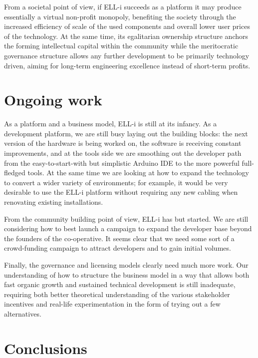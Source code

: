 \documentclass[final]{siamltex}
\begin{document}
From a societal point of view, if ELL-i succeeds as a platform it may
produce essentially a virtual non-profit monopoly, benefiting the
society through the increased efficiency of scale of the used
components and overall lower user prices of the technology.  At the
same time, its egalitarian ownership structure anchors the forming
intellectual capital within the community while the meritocratic
governance structure allows any further development to be primarily
technology driven, aiming for long-term engineering excellence instead
of short-term profits.


\section{Ongoing work}
\label{sec:ongoing}

As a platform and a business model, ELL-i is still at its infancy.  As
a development platform, we are still busy laying out the building
blocks: the next version of the hardware is being worked on, the
software is receiving constant improvements, and at the tools side we
are smoothing out the developer path from the easy-to-start-with but
simplistic Arduino IDE to the more powerful full-fledged tools.  At
the same time we are looking at how to expand the technology to convert
a wider variety of environments; for example, it would be very
desirable to use the ELL-i platform without requiring any new cabling
when renovating existing installations.

From the community building point of view, ELL-i has but started.
We are still considering how to best launch a campaign to expand the
developer base beyond the founders of the co-operative.  It seems
clear that we need some sort of a crowd-funding campaign to attract
developers and to gain initial volumes.

Finally, the governance and licensing models clearly need much more
work.  Our understanding of how to structure the business model in a
way that allows both fast organic growth and sustained technical
development is still inadequate, requiring both better theoretical
understanding of the various stakeholder incentives and real-life
experimentation in the form of trying out a few alternatives.


\section{Conclusions}
\label{sec:conclusions}
\end{document}
